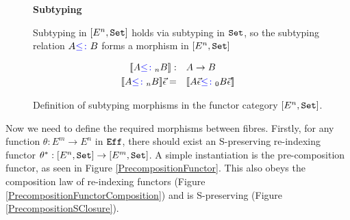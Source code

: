 \begin{figure}
    \begin{framed}
        
\centering\textbf{Subtyping}


Subtyping in $[E^n, \texttt{Set}]$ holds via subtyping in $\texttt{Set}$, so the subtyping relation $A {\color{blue} \leq\colon} B$ forms a morphism in $[E^n, \texttt{Set}]$

\begin{align*}
    {\bf [\![}A{\color{blue} \leq\colon}_n B{\bf ]\!]}:&\quad A\rightarrow B\\
    {\bf [\![}A{\color{blue} \leq\colon}_n B{\bf ]\!]}\vec{\epsilon}=&\quad {\bf [\![}A\vec{\epsilon}{\color{blue} \leq\colon}_0 B\vec{\epsilon}{\bf ]\!]}
\end{align*}



    \end{framed}
    \caption{Definition of subtyping morphisms in the functor category $[E^n, \texttt{Set}]$.}
    \label{HowToBuildSubtyping}
\end{figure}

Now we need to define the required morphisms between fibres. Firstly, for any function $\theta: E^m \rightarrow E^n$ in $\texttt{Eff}$, there should exist an S-preserving re-indexing functor $\theta^*: [E^n, \texttt{Set}] \rightarrow [E^m, \texttt{Set}]$. A simple instantiation is the pre-composition functor, as seen in Figure \ref{PrecompositionFunctor}. This also obeys the composition law of re-indexing functors (Figure \ref{PrecompositionFunctorComposition}) and is S-preserving (Figure \ref{PrecompositionSClosure}).


